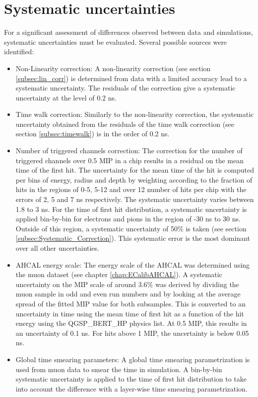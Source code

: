 \section{Systematic uncertainties}

For a significant assessment of differences observed between data and simulations, systematic uncertainties must be evaluated. Several possible sources were identified:

\begin{itemize}
	\item Non-Linearity correction: A non-linearity correction (see section \ref{subsec:lin_corr}) is determined from data with a limited accuracy lead to a systematic uncertainty. The residuals of the correction give a systematic uncertainty at the level of 0.2 ns.
	\item Time walk correction: Similarly to the non-linearity correction, the systematic uncertainty obtained from the residuals of the time walk correction (see section \ref{subsec:timewalk}) is in the order of 0.2 ns.
	\item Number of triggered channels correction: The correction for the number of triggered channels over 0.5 MIP in a chip results in a residual on the mean time of the first hit. The uncertainty for the mean time of the hit is computed per bins of energy, radius and depth by weighting according to the fraction of hits in the regions of 0-5, 5-12 and over 12 number of hits per chip with the errors of 2, 5 and 7 ns respectively. The systematic uncertainty varies between 1.8 to 3 ns. For the time of first hit distribution, a systematic uncertainty is applied bin-by-bin for electrons and pions in the region of -30 ns to 30 ns. Outside of this region, a systematic uncertainty of 50\% is taken (see section \ref{subsec:Systematic_Correction}). This systematic error is the most dominant over all other uncertainties.
	\item AHCAL energy scale: The energy scale of the AHCAL was determined using the muon dataset (see chapter \ref{chap:ECalibAHCAL}). A systematic uncertainty on the MIP scale of around 3.6\% was derived by dividing the muon sample in odd and even run numbers and by looking at the average spread of the fitted MIP value for both subsamples. This is converted to an uncertainty in time using the mean time of first hit as a function of the hit energy using the QGSP\_BERT\_HP physics list. At 0.5 MIP, this results in an uncertainty of 0.1 ns. For hits above 1 MIP, the uncertainty is below 0.05 ns.
	\item Global time smearing parameters: A global time smearing parametrization is used from muon data to smear the time in simulation. A bin-by-bin systematic uncertainty is applied to the time of first hit distribution to take into account the difference with a layer-wise time smearing parametrization.

\end{itemize}
